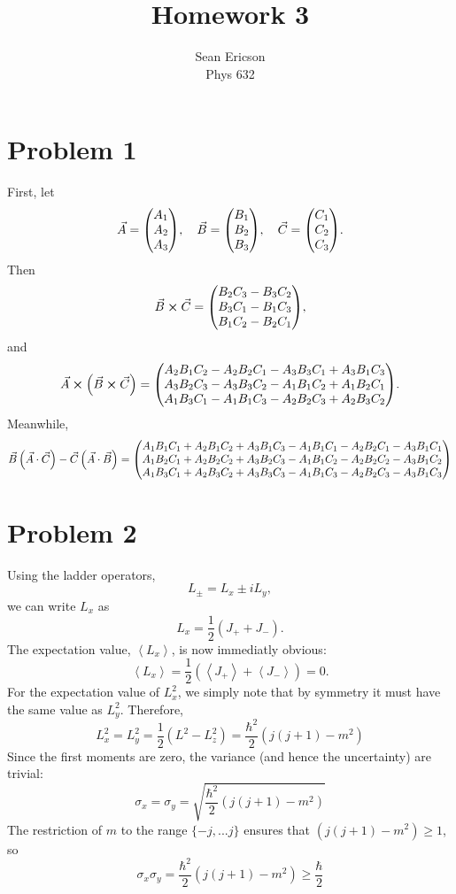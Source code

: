 \documentclass[12pt]{article}
\newcommand{\avg}[1]{\left<#1\right>}
\begin{document}
	
\title{Homework 3}
\author{Sean Ericson \\ Phys 632}
\maketitle

\section*{Problem 1}
First, let
\[ \vec{A} = \mqty(A_1\\A_2\\A_3), \quad \vec{B} = \mqty(B_1\\B_2\\B_3), \quad \vec{C} = \mqty(C_1\\C_2\\C_3). \]
Then
\[ \vec{B}\cross\vec{C} = \mqty(B_2C_3-B_3C_2\\B_3C_1-B_1C_3\\B_1C_2-B_2C_1), \]
and
\[ \vec{A}\cross\left(\vec{B}\cross\vec{C}\right) = \mqty(A_2B_1C_2 - A_2B_2C_1 - A_3B_3C_1 + A_3B_1C_3 \\ A_3B_2C_3 - A_3B_3C_2 - A_1B_1C_2 + A_1B_2C_1 \\ A_1B_3C_1 - A_1B_1C_3 - A_2B_2C_3 + A_2B_3C_2). \]
Meanwhile,
\[ \vec{B}\left(\vec{A}\cdot\vec{C}\right) - \vec{C}\left(\vec{A}\cdot\vec{B}\right) = \mqty(A_1B_1C_1 + A_2B_1C_2 + A_3B_1C_3 - A_1B_1C_1 - A_2B_2C_1 - A_3B_1C_1 \\ A_1B_2C_1 + A_2B_2C_2 + A_3B_2C_3 - A_1B_1C_2 - A_2B_2C_2 - A_3B_1C_2 \\ A_1B_3C_1 + A_2B_3C_2 + A_3B_3C_3 - A_1B_1C_3 - A_2B_2C_3 - A_3B_1C_3 ) \]

\section*{Problem 2}
Using the ladder operators,
\[ L_\pm = L_x \pm iL_y, \]
we can write $L_x$ as
\[ L_x = \frac{1}{2}\left(J_+ + J_-\right). \]
The expectation value, $\avg{L_x}$, is now immediatly obvious:
\[ \avg{L_x} = \frac{1}{2}\left(\avg{J_+} + \avg{J_-}\right) = 0. \]
For the expectation value of $L_x^2$, we simply note that by symmetry it must have the same value as $L_y^2$. Therefore,
\[ L_x^2 = L_y^2 = \frac{1}{2}\left(L^2 - L_z^2\right) = \frac{\hbar^2}{2}(j(j+1)-m^2) \]
Since the first moments are zero, the variance (and hence the uncertainty) are trivial:
\[ \sigma_x = \sigma_y = \sqrt{\frac{\hbar^2}{2}(j(j+1)-m^2)} \]
The restriction of $m$ to the range $\{-j,...j\}$ ensures that $(j(j+1)-m^2)\geq1$, so
\[ \sigma_x\sigma_y = \frac{\hbar^2}{2}(j(j+1)-m^2) \geq \frac{\hbar}{2} \]
\end{document}

